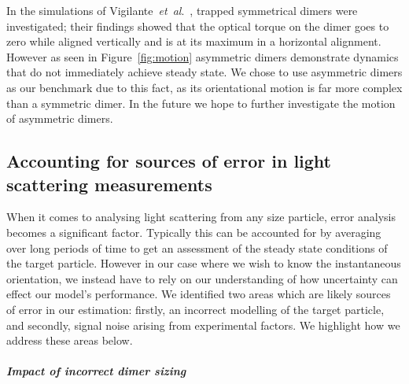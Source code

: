 In the simulations of Vigilante~\emph{et~al}.\ \cite{Vigilante2020Brownian_OT}, trapped symmetrical dimers were investigated; their findings showed that the optical torque on the dimer goes to zero while aligned vertically and is at its maximum in a horizontal alignment. However as seen in Figure~\ref{fig:motion} asymmetric dimers demonstrate dynamics that do not immediately achieve steady state. We chose to use asymmetric dimers as our benchmark due to this fact, as its orientational motion is far more complex than a symmetric dimer. In the future we hope to further investigate the motion of asymmetric dimers. 
\subsection{Accounting for sources of error in light scattering measurements}
When it comes to analysing light scattering from any size particle, error analysis becomes a significant factor. Typically this can be accounted for by averaging over long periods of time to get an assessment of the steady state conditions of the target particle. However in our case where we wish to know the instantaneous orientation, we instead have to rely on our understanding of how uncertainty can effect our model's performance. We identified two areas which are likely sources of error in our estimation: firstly, an incorrect modelling of the target particle, and secondly, signal noise arising from experimental factors. We highlight how we address these areas below. 
\subparagraph{Impact of incorrect dimer sizing}
\label{sec:lam}

